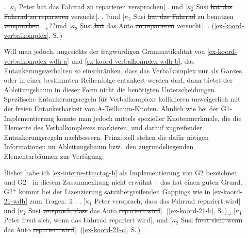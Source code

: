 \ex. [$\kappa_1$ Peter hat das Fahrrad zu reparieren versprochen]\label{ex-koord-verbalkomplex-wdh}
\a. und [$\kappa_2$ Susi \sout{hat das Fahrrad zu reparieren} versucht].
\b. ?und [$\kappa_2$ Susi \sout{hat das Fahrrad} zu benutzen \sout{versprochen}].\label{ex-koord-verbalkomplex-wdh-a}
\c. ??und [$\kappa_2$  Susi \sout{hat} das Auto \sout{zu reparieren} versucht].\label{ex-koord-verbalkomplex-wdh-b}
\z. (\ref{ex-koord-verbalkomplex}, S.\,\pageref{ex-koord-verbalkomplex})

Will man jedoch, angesichts der fragwürdigen Grammatikalität von \ref{ex-koord-verbalkomplex-wdh-a} und \ref{ex-koord-verbalkomplex-wdh-b}, das Entankerungsverhalten so einschränken, dass das Verbalkomplex nur als Ganzes oder in einer bestimmten Reihenfolge entankert werden darf, dann bietet der Ableitungsbaum in dieser Form nicht die benötigten Unterscheidungen. Spezifische Entankerungsregeln für Verbalkomplexe kollidieren unweigerlich mit der freien Entankerbarkeit von A-Teilbaum-Knoten. Ähnlich wie bei der G1-Implementierung könnte man jedoch mittels spezieller Knotenmerkmale, die die Elemente des Verbalkomplexes markieren, und darauf zugreifender Entankerungsregeln nachbessern. Prinzipiell stehen die dafür nötigen Informationen im Ableitungsbaum bzw.\ den zugrundeliegenden Elementarbäumen zur Verfügung. 

Bisher habe ich \ref{ex-interne-ttmctag-b} als Implementierung von G2 bezeichnet und G2$^+$ in diesem Zusammenhang nicht erwähnt -- das hat einen guten Grund. G2$^+$ kommt bei der Lizenzierung satzübergreifenden Gappings wie in \ref{ex-koord-21-wdh} zum Tragen:
ii
\ex. \label{ex-koord-21-wdh}
\a. \label{ex-koord-21-b-wdh}[$\kappa_1$ Peter versprach, dass das Fahrrad repariert wird] und [$\kappa_2$ Susi \sout{versprach, dass} das Auto \sout{repariert wird}]. \hfill (\ref{ex-koord-21-b}, S.\,\pageref{ex-koord-21-b})
\b. \label{ex-koord-21-c-wdh}[$\kappa_1$ Peter freut sich, wenn das Fahrrad repariert wird], und [$\kappa_2$ Susi \sout{freut sich, wenn} das Auto \sout{repariert wird}]. \hfill (\ref{ex-koord-21-c}, S.\,\pageref{ex-koord-21-c})


